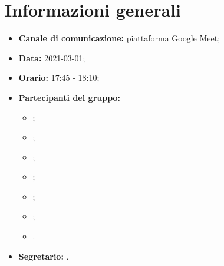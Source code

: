 \section{Informazioni generali}
\begin{itemize}
\item \textbf{Canale di comunicazione:} piattaforma Google Meet;
\item \textbf{Data:} 2021-03-01;
\item \textbf{Orario:} 17:45 - 18:10;
\item \textbf{Partecipanti del gruppo:}
	\begin{itemize}
	\item \MDI ;
	\item \MB ;
	\item \GB ;
	\item \VAS ;
	\item \FD ;
	\item \NM ;
	\item \SB .
	\end{itemize}
\item \textbf{Segretario:} \MDI .

\end{itemize}